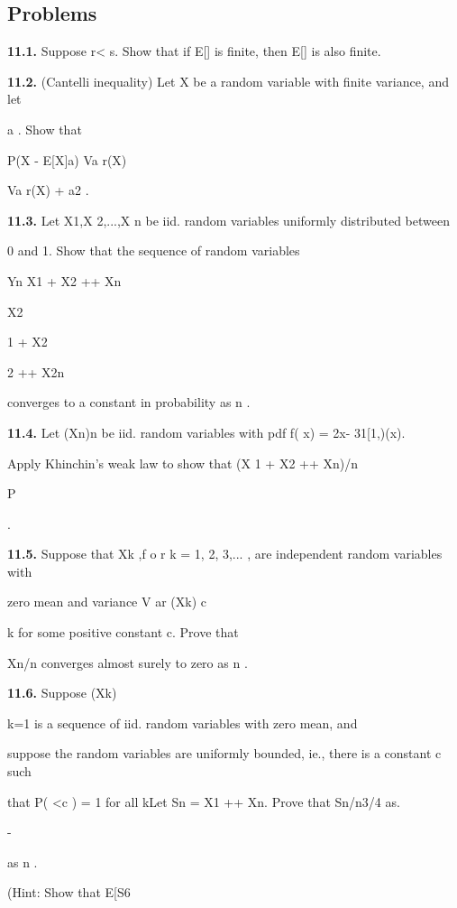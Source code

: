 \subsection*{Problems}

\textbf{11.1.} Suppose r< s. Show that if E[\vertX\verts] is finite, then E[\vertX\vertr] is also finite.

\textbf{11.2.} (Cantelli inequality) Let X be a random variable with finite variance, and let

a . Show that

P(X - E[X]\geq a) \leq Va r(X)

Va r(X) + a2 .

\textbf{11.3.} Let X1,X 2,...,X n be iid. random variables uniformly distributed between

0 and 1. Show that the sequence of random variables

Yn \coloneqq X1 + X2 +\cdot\cdot\cdot+ Xn

X2

1 + X2

2 +\cdot\cdot\cdot+ X2n

converges to a constant in probability as n \to\infty .

\textbf{11.4.} Let (Xn)n be iid. random variables with pdf f( x) = 2x- 31[1,\infty )(x).

Apply Khinchin's weak law to show that (X 1 + X2 +\cdot\cdot\cdot+ Xn)/n

P

.

\textbf{11.5.} Suppose that Xk ,f o r k = 1, 2, 3,... , are independent random variables with

zero mean and variance V ar (Xk) \leq c

\sqrt

k for some positive constant c. Prove that

Xn/n converges almost surely to zero as n \to\infty .

\textbf{11.6.} Suppose (Xk)\infty

k=1 is a sequence of iid. random variables with zero mean, and

suppose the random variables are uniformly bounded, ie., there is a constant c such

that P( \vertXk\vert <c ) = 1 for all kLet Sn = X1 +\cdot\cdot\cdot+ Xn. Prove that Sn/n3/4 as.

-

as n \to\infty .

(Hint: Show that E[S6

